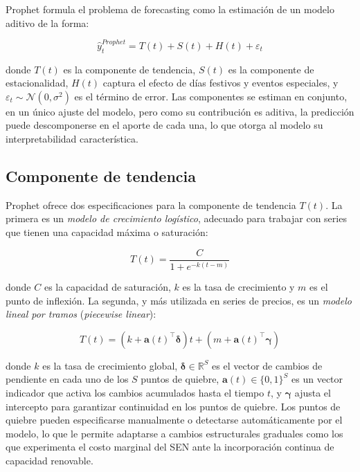 Prophet formula el problema de forecasting como la estimación de un modelo aditivo de la forma:

\begin{equation}
\hat{y}_t^{Prophet} = T(t) + S(t) + H(t) + \varepsilon_t
\end{equation}

donde $T(t)$ es la componente de tendencia, $S(t)$ es la componente de estacionalidad, $H(t)$ captura el efecto de días festivos y eventos especiales, y $\varepsilon_t \sim \mathcal{N}(0, \sigma^2)$ es el término de error. Las componentes se estiman en conjunto, en un único ajuste del modelo, pero como su contribución es aditiva, la predicción puede descomponerse en el aporte de cada una, lo que otorga al modelo su interpretabilidad característica.

\subsection{Componente de tendencia}

Prophet ofrece dos especificaciones para la componente de tendencia $T(t)$. La primera es un \textit{modelo de crecimiento logístico}, adecuado para trabajar con series que tienen una capacidad máxima o saturación:

\begin{equation}
T(t) = \frac{C}{1 + e^{-k(t - m)}}
\end{equation}

donde $C$ es la capacidad de saturación, $k$ es la tasa de crecimiento y $m$ es el punto de inflexión. La segunda, y más utilizada en series de precios, es un \textit{modelo lineal por tramos} (\textit{piecewise linear}):

\begin{equation}
T(t) = (k + \mathbf{a}(t)^\top \boldsymbol{\delta})t + (m + \mathbf{a}(t)^\top \boldsymbol{\gamma})
\end{equation}

donde $k$ es la tasa de crecimiento global, $\boldsymbol{\delta} \in \mathbb{R}^S$ es el vector de cambios de pendiente en cada uno de los $S$ puntos de quiebre, $\mathbf{a}(t) \in \{0,1\}^S$ es un vector indicador que activa los cambios acumulados hasta el tiempo $t$, y $\boldsymbol{\gamma}$ ajusta el intercepto para garantizar continuidad en los puntos de quiebre. Los puntos de quiebre pueden especificarse manualmente o detectarse automáticamente por el modelo, lo que le permite adaptarse a cambios estructurales graduales como los que experimenta el costo marginal del SEN ante la incorporación continua de capacidad renovable.

